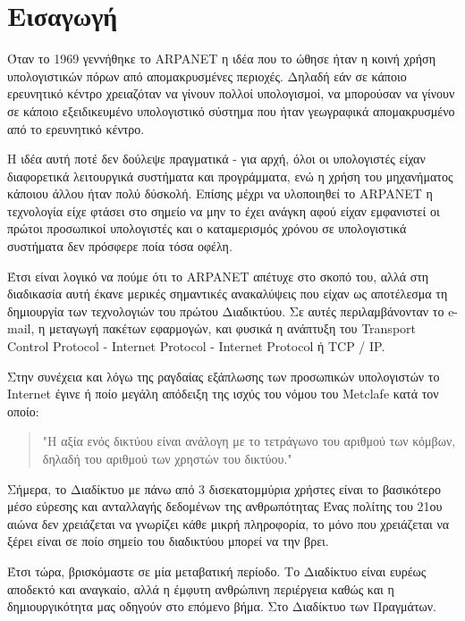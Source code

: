 \chapter{Εισαγωγή}\label{ch:intro}

Όταν το 1969 γεννήθηκε το ARPANET η ιδέα που το ώθησε  ήταν η κοινή χρήση υπολογιστικών πόρων από απομακρυσμένες περιοχές. Δηλαδή εάν σε κάποιο ερευνητικό κέντρο χρειαζόταν να γίνουν πολλοί υπολογισμοί, να μπορούσαν να γίνουν σε κάποιο εξειδικευμένο υπολογιστικό σύστημα που ήταν γεωγραφικά απομακρυσμένο από το ερευνητικό κέντρο.

H ιδέα αυτή ποτέ δεν δούλεψε πραγματικά - για αρχή, όλοι οι υπολογιστές είχαν διαφορετικά λειτουργικά συστήματα και προγράμματα, ενώ η χρήση του μηχανήματος κάποιου άλλου ήταν πολύ δύσκολή. Επίσης μέχρι να υλοποιηθεί το ARPANET η τεχνολογία είχε φτάσει στο σημείο να μην το έχει ανάγκη αφού είχαν εμφανιστεί οι πρώτοι προσωπικοί υπολογιστές και ο καταμερισμός χρόνου σε υπολογιστικά συστήματα δεν πρόσφερε ποία τόσα οφέλη.

Έτσι είναι λογικό να πούμε ότι το ARPANET απέτυχε στο σκοπό του, αλλά στη διαδικασία αυτή έκανε μερικές σημαντικές ανακαλύψεις που είχαν ως αποτέλεσμα τη δημιουργία των τεχνολογιών του πρώτου Διαδικτύου. Σε αυτές περιλαμβάνονταν το e-mail, η μεταγωγή πακέτων εφαρμογών, και φυσικά η ανάπτυξη του Transport Control Protocol - Internet Protocol - Internet Protocol ή TCP / IP.

Στην συνέχεια και λόγω της ραγδαίας εξάπλωσης των προσωπικών υπολογιστών το Internet έγινε ή ποίο μεγάλη απόδειξη της ισχύς του νόμου του Metclafe κατά τον οποίο:%
\begin{quotation}
"Η αξία ενός δικτύου είναι ανάλογη με το τετράγωνο του αριθμού των κόμβων, δηλαδή του αριθμού των χρηστών του δικτύου."
\end{quotation}

Σήμερα, το Διαδίκτυο με πάνω από 3 δισεκατομμύρια χρήστες είναι το βασικότερο μέσο 
εύρεσης και ανταλλαγής δεδομένων της ανθρωπότητας Ένας πολίτης του 21ου αιώνα δεν χρειάζεται να γνωρίζει κάθε μικρή πληροφορία, το μόνο που χρειάζεται να ξέρει είναι σε ποίο σημείο του διαδικτύου μπορεί να την βρει. 

Έτσι τώρα, βρισκόμαστε σε μία μεταβατική περίοδο. Το Διαδίκτυο είναι ευρέως αποδεκτό και αναγκαίο, αλλά η έμφυτη ανθρώπινη περιέργεια καθώς και η δημιουργικότητα μας οδηγούν στο επόμενο βήμα. Στο Διαδίκτυο των Πραγμάτων.

